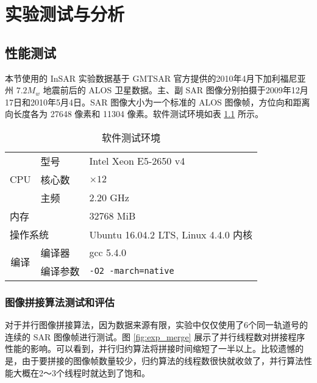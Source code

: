 \chapter{实验测试与分析}

\section{性能测试}

本节使用的 InSAR 实验数据基于 GMTSAR 官方提供的2010年4月下加利福尼亚州 $7.2 M_w$ 地震前后的 ALOS 卫星数据。主、副 SAR 图像分别拍摄于2009年12月17日和2010年5月4日。SAR 图像大小为一个标准的 ALOS 图像帧，方位向和距离向长度各为 27648 像素和 11304 像素。软件测试环境如表 \ref{tab:env} 所示。

\begin{table}[htbp]
\centering
\begin{tabular}{|l|l|l|}
\hline
    \multirow{3}{*}{CPU}                        & 型号     & Intel Xeon E5-2650 v4                 \\ \cline{2-3} 
                                                & 核心数   & $\times 12$                           \\ \cline{2-3} 
                                                & 主频     & 2.20 GHz                              \\ \hline
    \multicolumn{2}{|l|}{内存}                             & 32768 MiB                             \\ \hline
    \multicolumn{2}{|l|}{操作系统}                         & Ubuntu 16.04.2 LTS, Linux 4.4.0 内核  \\ \hline
    \multicolumn{1}{|c|}{\multirow{2}{*}{编译}} & 编译器   & gcc 5.4.0                             \\ \cline{2-3} 
    \multicolumn{1}{|c|}{}                      & 编译参数 & \texttt{-O2 -march=native}            \\ \hline
\end{tabular}
\caption{软件测试环境} \label{tab:env}
\end{table}

\subsection{图像拼接算法测试和评估}

对于并行图像拼接算法，因为数据来源有限，实验中仅仅使用了6个同一轨道号的连续的 SAR 图像帧进行测试。图 \ref{fig:exp_merge} 展示了并行线程数对拼接程序性能的影响。可以看到，并行归约算法将拼接时间缩短了一半以上。比较遗憾的是，由于要拼接的图像帧数量较少，归约算法的线程数很快就收敛了，并行算法性能大概在2～3个线程时就达到了饱和。

